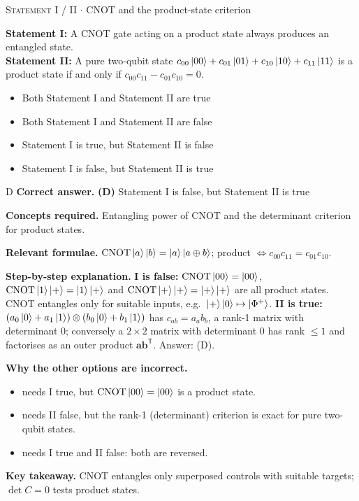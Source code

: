 \documentclass[11pt,a4paper]{article}
\newcommand{\optlabel}[1]{\textbf{(#1)}}
\newcommand{\correctlabel}[1]{\textcolor{okgreen}{\textbf{(#1)}\,\ding{51}}}
\newenvironment{qitem}[1]{\begin{list}{}{\setlength{\leftmargin}{3.3em}\setlength{\labelwidth}{3.1em}%
  \setlength{\labelsep}{0.2em}\setlength{\topsep}{3pt}\setlength{\parsep}{3pt}}\item[\textbf{Q.#1}\hfill]}{\end{list}}
\newcommand{\qsep}{\par\vspace{2pt}{\color{black!15}\hrule}\vspace{4pt}}
\newcommand{\qmeta}[2]{{\footnotesize\color{black!60}\textsc{#1} \;$\cdot$\; #2}\par}
\begin{document}
\begin{qitem}{38}
\qmeta{Statement I / II}{CNOT and the product-state criterion}
\textbf{Statement I:} A CNOT gate acting on a product state always produces an entangled state.\\[1mm]
\textbf{Statement II:} A pure two-qubit state $c_{00}\ket{00} + c_{01}\ket{01} + c_{10}\ket{10} + c_{11}\ket{11}$ is a product state if and
only if $c_{00}c_{11} - c_{01}c_{10} = 0$.
\begin{itemize}[leftmargin=2.6em, labelsep=0.4em, itemsep=2pt, topsep=3pt]
\item[\optlabel{A}] Both Statement I and Statement II are true
\item[\optlabel{B}] Both Statement I and Statement II are false
\item[\optlabel{C}] Statement I is true, but Statement II is false
\item[\correctlabel{D}] Statement I is false, but Statement II is true
\end{itemize}
\end{qitem}
\begin{solbox}{D}
\textbf{\color{brand}Correct answer.} \textcolor{okgreen}{\textbf{(D)}} Statement I is false, but Statement II is true

\textbf{\color{brand}Concepts required.} Entangling power of CNOT and the determinant criterion for product states.

\textbf{\color{brand}Relevant formulae.} $\mathrm{CNOT}\ket{a}\ket{b} = \ket a\ket{a\oplus b}$; product $\Leftrightarrow c_{00}c_{11} = c_{01}c_{10}$.

\textbf{\color{brand}Step-by-step explanation.} \textbf{I is false:} $\mathrm{CNOT}\ket{00} = \ket{00}$, $\mathrm{CNOT}\ket{1}\ket{+} = \ket1\ket+$ and
$\mathrm{CNOT}\ket+\ket+ = \ket+\ket+$ are all product states. CNOT entangles only for suitable inputs, e.g.\ $\ket+\ket0 \mapsto \ket{\Phi^+}$.
\textbf{II is true:} $(a_0\ket0 + a_1\ket1)\otimes(b_0\ket0 + b_1\ket1)$ has $c_{ab} = a_ab_b$, a rank-1 matrix with determinant 0;
conversely a $2\times2$ matrix with determinant 0 has rank $\le 1$ and factorises as an outer product $\mathbf a\mathbf b^{\mathsf T}$.
Answer: (D).

\textbf{\color{brand}Why the other options are incorrect.}
\begin{itemize}[leftmargin=2.4em, itemsep=1pt, topsep=2pt]
\item[\textbf{(A)}] needs I true, but $\mathrm{CNOT}\ket{00} = \ket{00}$ is a product state.
\item[\textbf{(B)}] needs II false, but the rank-1 (determinant) criterion is exact for pure two-qubit states.
\item[\textbf{(C)}] needs I true and II false: both are reversed.
\end{itemize}
\textbf{\color{brand}Key takeaway.} CNOT entangles only superposed controls with suitable targets; $\det C = 0$ tests product states.
\end{solbox}
\qsep
\end{document}
